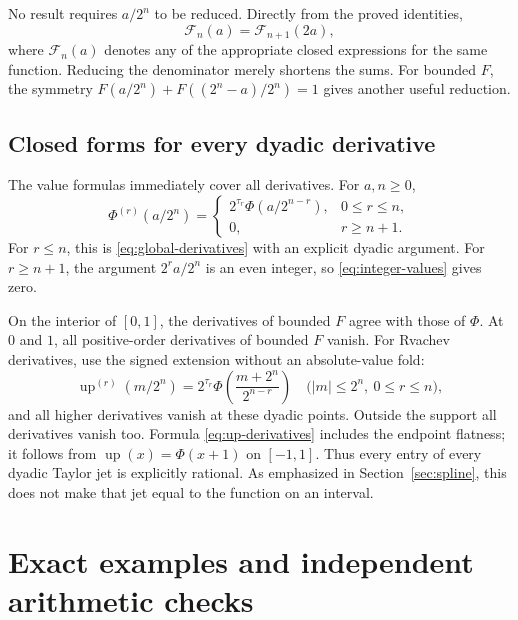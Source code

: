 \documentclass[11pt,a4paper]{article}
\theoremstyle{definition}
\theoremstyle{remark}
\newcommand{\Up}{\operatorname{up}}
\begin{document}
No result requires \(a/2^n\) to be reduced.  Directly from the proved identities,
\[
 \mathcal F_n(a)=\mathcal F_{n+1}(2a),
\]
where \(\mathcal F_n(a)\) denotes any of the appropriate closed expressions for the
same function.  Reducing the denominator merely shortens the sums.  For bounded
\(F\), the symmetry
\(F(a/2^n)+F((2^n-a)/2^n)=1\) gives another useful reduction.

\subsection{Closed forms for every dyadic derivative}
The value formulas immediately cover all derivatives.  For \(a,n\geq0\),
\begin{equation}
 \Phi^{(r)}(a/2^n)=
 \begin{cases}
  2^{\tau_r}\Phi(a/2^{n-r}),&0\leq r\leq n,\\
  0,&r\geq n+1.
 \end{cases}                                               \label{eq:dyadic-derivatives}
\end{equation}
For \(r\leq n\), this is \eqref{eq:global-derivatives} with an explicit dyadic
argument.  For \(r\geq n+1\), the argument \(2^ra/2^n\) is an even integer, so
\eqref{eq:integer-values} gives zero.

On the interior of \([0,1]\), the derivatives of bounded \(F\) agree with those
of \(\Phi\).  At \(0\) and \(1\), all positive-order derivatives of bounded \(F\)
vanish.  For Rvachev derivatives, use the signed extension without an absolute-value
fold:
\begin{equation}
 \Up^{(r)}(m/2^n)
   =2^{\tau_r}\Phi\!\left(\frac{m+2^n}{2^{n-r}}\right)
       \quad\bigl(|m|\leq2^n,\ 0\leq r\leq n\bigr),   \label{eq:up-derivatives}
\end{equation}
and all higher derivatives vanish at these dyadic points.  Outside the support all
derivatives vanish too.  Formula \eqref{eq:up-derivatives} includes the endpoint
flatness; it follows from \(\Up(x)=\Phi(x+1)\) on \([-1,1]\).
Thus every entry of every dyadic Taylor jet is explicitly rational.  As emphasized
in Section~\ref{sec:spline}, this does not make that jet equal to the function on an
interval.

\section{Exact examples and independent arithmetic checks}
\label{sec:examples}
\end{document}
